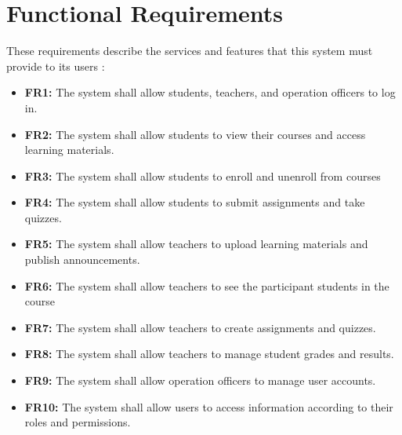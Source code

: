 \section{Functional Requirements}
These requirements describe the services and features that this system must provide to its users :
\begin{itemize}
    \item \textbf{FR1:} The system shall allow students, teachers, and operation officers to log in.
    
    \item \textbf{FR2:} The system shall allow students to view their courses and access learning materials.

    \item \textbf{FR3:} The system shall allow students to enroll and unenroll from courses 
    
    \item \textbf{FR4:} The system shall allow students to submit assignments and take quizzes.
    
    \item \textbf{FR5:} The system shall allow teachers to upload learning materials and publish announcements.

    \item \textbf{FR6:} The system shall allow teachers to see the participant students in the course
    
    \item \textbf{FR7:} The system shall allow teachers to create assignments and quizzes.
    
    \item \textbf{FR8:} The system shall allow teachers to manage student grades and results.
    
    \item \textbf{FR9:} The system shall allow operation officers to manage user accounts.
    
    \item \textbf{FR10:} The system shall allow users to access information according to their roles and permissions.
\end{itemize}


